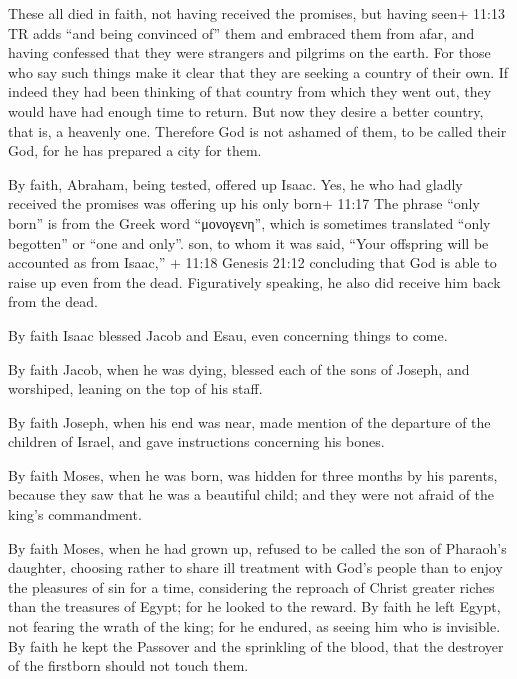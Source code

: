  These all died in faith, not having received the promises,
but having seen+ 11:13 TR adds ``and being convinced of'' them and
embraced them from afar, and having confessed that they were strangers
and pilgrims on the earth.  For those who say such things
make it clear that they are seeking a country of their own.
 If indeed they had been thinking of that country from
which they went out, they would have had enough time to return.
 But now they desire a better country, that is, a heavenly
one. Therefore God is not ashamed of them, to be called their God, for
he has prepared a city for them.

 By faith, Abraham, being tested, offered up Isaac. Yes, he
who had gladly received the promises was offering up his only born+
11:17 The phrase ``only born'' is from the Greek word ``μονογενη'',
which is sometimes translated ``only begotten'' or ``one and only''.
son,  to whom it was said, ``Your offspring will be
accounted as from Isaac,'' + 11:18 Genesis 21:12 
concluding that God is able to raise up even from the dead. Figuratively
speaking, he also did receive him back from the dead.

 By faith Isaac blessed Jacob and Esau, even concerning
things to come.

 By faith Jacob, when he was dying, blessed each of the
sons of Joseph, and worshiped, leaning on the top of his staff.

 By faith Joseph, when his end was near, made mention of
the departure of the children of Israel, and gave instructions
concerning his bones.

 By faith Moses, when he was born, was hidden for three
months by his parents, because they saw that he was a beautiful child;
and they were not afraid of the king's commandment.

 By faith Moses, when he had grown up, refused to be called
the son of Pharaoh's daughter,  choosing rather to share
ill treatment with God's people than to enjoy the pleasures of sin for a
time,  considering the reproach of Christ greater riches
than the treasures of Egypt; for he looked to the reward. 
By faith he left Egypt, not fearing the wrath of the king; for he
endured, as seeing him who is invisible.  By faith he kept
the Passover and the sprinkling of the blood, that the destroyer of the
firstborn should not touch them.

